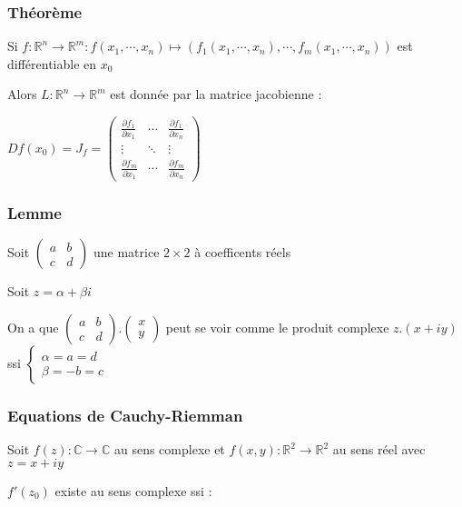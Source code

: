 \documentclass[a4paper,10pt]{report}
\newcommand{\ap}{\rightarrow}
\newcommand{\R}{\mathbb{R}}
\newcommand{\C}{\mathbb{C}}
\begin{document}
\subsubsection{Théorème}

Si $f : \R^n \ap \R^m : f(x_1, \cdots , x_n) \mapsto (f_1(x_1, \cdots, x_n), \cdots, f_m(x_1, \cdots, x_n))$ est différentiable en $x_0$

Alors $L : \R^n \ap \R^m$ est donnée par la matrice jacobienne :


$Df(x_0) = J_f = \left(
\begin{array}{ccc}
\frac{\partial f_1}{\partial x_1} & \cdots & \frac{\partial f_1}{\partial x_n} \\
\vdots & \ddots & \vdots \\
\frac{\partial f_m}{\partial x_1} & \cdots & \frac{\partial f_m}{\partial x_n}
\end{array} \right)$

\subsubsection{Lemme}

Soit $\left( \begin{array}{cc}
a & b \\
c & d
\end{array} \right)$ une matrice $2 \times 2$ à coefficents réels

Soit $z = \alpha + \beta i$

On a que $\left( \begin{array}{cc}
a & b \\
c & d
\end{array} \right).\left( \begin{array}{c}
x \\
y
\end{array} \right)$ peut se voir comme le produit complexe $z . (x + iy)$ ssi $\left\{ \begin{array}{c}
\alpha = a = d \\
\beta = -b = c
\end{array} \right.$

\subsubsection{Equations de Cauchy-Riemman}

Soit $f(z) : \C \ap \C$ au sens complexe et $f(x,y) : \R^2 \ap \R^2$ au sens réel avec $z = x + iy$

$f'(z_0)$ existe au sens complexe ssi :
\end{document}

